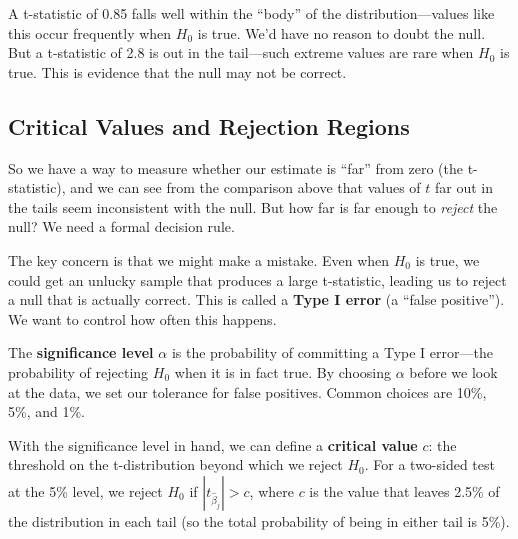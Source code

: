\documentclass[
  letterpaper,
  DIV=11,
  numbers=noendperiod]{scrreprt}
\begin{document}
A t-statistic of 0.85 falls well within the ``body'' of the
distribution---values like this occur frequently when \(H_0\) is true.
We'd have no reason to doubt the null. But a t-statistic of 2.8 is out
in the tail---such extreme values are rare when \(H_0\) is true. This is
evidence that the null may not be correct.

\subsection{Critical Values and Rejection
Regions}\label{critical-values-and-rejection-regions}

So we have a way to measure whether our estimate is ``far'' from zero
(the t-statistic), and we can see from the comparison above that values
of \(t\) far out in the tails seem inconsistent with the null. But how
far is far enough to \emph{reject} the null? We need a formal decision
rule.

The key concern is that we might make a mistake. Even when \(H_0\) is
true, we could get an unlucky sample that produces a large t-statistic,
leading us to reject a null that is actually correct. This is called a
\textbf{Type I error} (a ``false positive''). We want to control how
often this happens.

The \textbf{significance level} \(\alpha\) is the probability of
committing a Type I error---the probability of rejecting \(H_0\) when it
is in fact true. By choosing \(\alpha\) before we look at the data, we
set our tolerance for false positives. Common choices are 10\%, 5\%, and
1\%.

With the significance level in hand, we can define a \textbf{critical
value} \(c\): the threshold on the t-distribution beyond which we reject
\(H_0\). For a two-sided test at the 5\% level, we reject \(H_0\) if
\(|t_{\hat{\beta}_j}| > c\), where \(c\) is the value that leaves 2.5\%
of the distribution in each tail (so the total probability of being in
either tail is 5\%).
\end{document}
